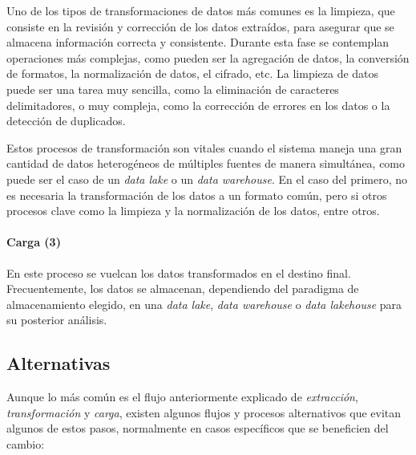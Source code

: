 Uno de los tipos de transformaciones de datos más comunes es la limpieza, que
consiste en la revisión y corrección de los datos extraídos, para asegurar que
se almacena información correcta y consistente. Durante esta fase se contemplan
operaciones más complejas, como pueden ser la agregación de datos, la conversión
de formatos, la normalización de datos, el cifrado, etc. La limpieza de datos
puede ser una tarea muy sencilla, como la eliminación de caracteres
delimitadores, o muy compleja, como la corrección de errores en los datos o la
detección de duplicados.

Estos procesos de transformación son vitales cuando el sistema maneja una gran
cantidad de datos heterogéneos de múltiples fuentes de manera simultánea, como
puede ser el caso de un \textit{data lake} o un \textit{data
warehouse}. En el caso del primero, no es necesaria la transformación de los
datos a un formato común, pero si otros procesos clave como la limpieza y la
normalización de los datos, entre otros.

\paragraph{Carga (3)}
En este proceso se vuelcan los datos transformados en el destino final.
Frecuentemente, los datos se almacenan, dependiendo del paradigma de
almacenamiento elegido, en una \textit{data lake}, \textit{data warehouse} o
\textit{data lakehouse} para su posterior análisis.



\newpage{}
\subsection{Alternativas}
Aunque lo más común es el flujo anteriormente explicado de \textit{extracción},
\textit{transformación} y \textit{carga}, existen algunos flujos y procesos
alternativos que evitan algunos de estos pasos, normalmente en casos específicos
que se beneficien del cambio: %

